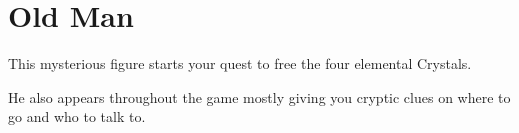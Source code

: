 \section{Old Man}
\label{char:old_man}


This mysterious figure starts your quest to free the four elemental Crystals.

He also appears throughout the game mostly giving you cryptic clues on where to go and who to talk to.

